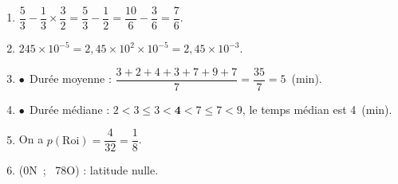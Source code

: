 
\medskip

%
%
%

\begin{enumerate}
\item $\dfrac{5}{3} - \dfrac{1}{3}\times \dfrac{3}{2} = \dfrac{5}{3} - \dfrac{1}{2} = \dfrac{10}{6} - \dfrac{3}{6} = \dfrac{7}{6}$.
\item $245 \times 10^{-5} = 2,45 \times 10^2 \times 10^{-5} = 2,45 \times 10^{-3}$.
\item $\bullet~~$Durée moyenne : $\dfrac{3 + 2 + 4 + 3 + 7 + 9 + 7}{7} = \dfrac{35}{7} = 5$~(min).

\item $\bullet~~$Durée médiane : $2 < 3 \leqslant 3 < \textbf{4} < 7 \leqslant 7 < 9$, le temps médian est 4~(min).
\item On a $p(\text{Roi}) = \dfrac{4}{32} = \dfrac{1}{8}$.
\item (0\degre N~;~ 78\degre O) : latitude nulle.
\end{enumerate}

\vspace{0,5cm}

